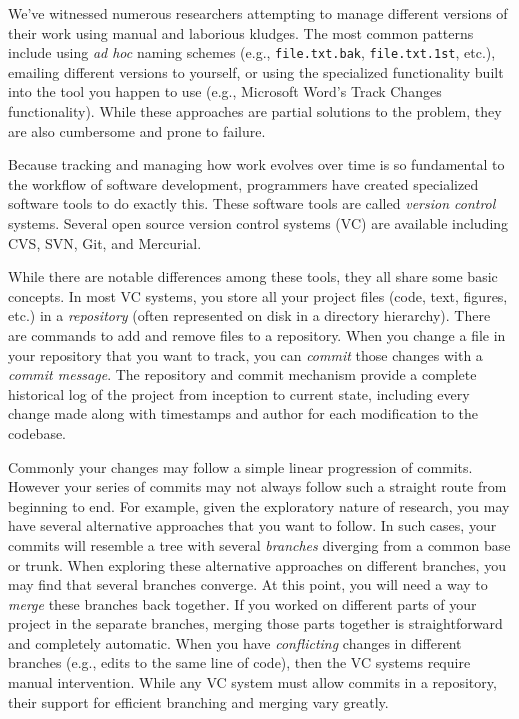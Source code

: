 \documentclass[ChapterTOCs,krantz2]{krantz} %
\begin{document}
We've witnessed numerous researchers attempting to manage different versions of
their work using manual and laborious kludges. The most common patterns include
using \emph{ad hoc} naming schemes (e.g., \texttt{file.txt.bak},
\texttt{file.txt.1st}, etc.), emailing different versions to yourself, or using
the specialized functionality built into the tool you happen to use (e.g.,
Microsoft Word's Track Changes functionality).  While these approaches are
partial solutions to the problem, they are also cumbersome and prone to
failure.

Because tracking and managing how work evolves over time is so fundamental to the
workflow of software development, programmers have created specialized software
tools to do exactly this. These software tools are called \emph{version
control} systems. Several open source version control systems (VC) are
available including CVS, SVN, Git, and Mercurial.

While there are notable differences among these tools, they all share some
basic concepts.  In most VC systems, you store all your project files (code,
text, figures, etc.) in a \emph{repository} (often represented on disk in a
directory hierarchy).  There are commands to add and
remove files to a repository.  When you change a file in your repository that
you want to track, you can \emph{commit} those changes with a \emph{commit
message}.  The repository and commit mechanism provide a complete historical
log of the project from inception to current state, including every change made
along with timestamps and author for each modification to the codebase.

Commonly your changes may follow a simple linear progression of commits.
However your series of commits may not always follow such a straight route from
beginning to end. For example, given the exploratory nature of research, you
may have several alternative approaches that you want to follow. In such cases,
your commits will resemble a tree with several \emph{branches} diverging from a
common base or trunk. When exploring these alternative approaches on different
branches, you may find that several branches converge. At
this point, you will need a way to \emph{merge} these branches back together.
If you worked on different parts of your project in the separate branches,
merging those parts together is straightforward and completely automatic. When
you have \emph{conflicting} changes in different branches (e.g., edits to the
same line of code), then the VC systems require manual intervention. While any
VC system must allow commits in a repository, their support for efficient
branching and merging vary greatly.
\end{document}
